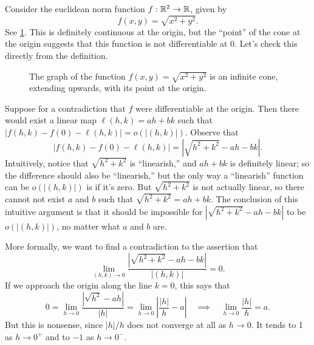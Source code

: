 \begin{example}
	Consider the euclidean norm function $f : \mathbb{R}^2 \to \mathbb{R}$, given by 
	\[ f(x,y) = \sqrt{x^2 + y^2}. \]
	See \cref{euclidean-norm-graph}. This is definitely continuous at the origin, but the ``point'' of the cone at the origin suggests that this function is not differentiable at 0. Let's check this directly from the definition. 
	
	\begin{figure}[ht]
		\begin{center}
		\end{center}
		\caption{The graph of the function  $f(x,y) = \sqrt{x^2 + y^2}$ is an infinite cone, extending upwards, with its point at the origin.} \label{euclidean-norm-graph}
	\end{figure}
	
	Suppose for a contradiction that $f$ were differentiable at the origin. Then there would exist a linear map $\ell(h,k) = ah + bk$ such that $|f(h,k) - f(0) - \ell(h,k)| = o(|(h,k)|)$. 
	Observe that
	\[ |f(h,k) - f(0) - \ell(h,k)| = |\sqrt{h^2 +  k^2} - ah - bk|. \]
	Intuitively, notice that $\sqrt{h^2 + k^2}$ is ``linearish,'' and $ah + bk$ is definitely linear; so the difference should also be ``linearish,'' but the only way a ``linearish'' function can be $o(|(h,k)|)$ is if it's zero. But $\sqrt{h^2 + k^2}$ is not actually linear, so there cannot not exist $a$ and $b$ such that $\sqrt{h^2 + k^2} = ah + bk$. The conclusion of this intuitive argument is that it should be impossible for $|\sqrt{h^2 + k^2} - ah - bk|$ to be $o(|(h,k)|)$, no matter what $a$ and $b$ are. 
	
	More formally, we want to find a contradiction to the assertion that
	\[ \lim_{(h,k) \to 0} \frac{|\sqrt{h^2 + k^2} - ah - bk|}{|(h,k)|} = 0. \]
	If we approach the origin along the line $k = 0$, this says that
	\[ 0 = \lim_{h \to 0} \frac{|\sqrt{h^2} - ah|}{|h|} = \lim_{h \to 0} \left| \frac{|h|}{h} - a \right| \quad\implies\quad \lim_{h \to 0} \frac{|h|}{h} = a.  \]
	But this is nonsense, since $|h|/h$ does not converge at all as $h \to 0$. It tends to 1 as $h \to 0^+$ and to $-1$ as $h \to 0^-$. 
\end{example}

